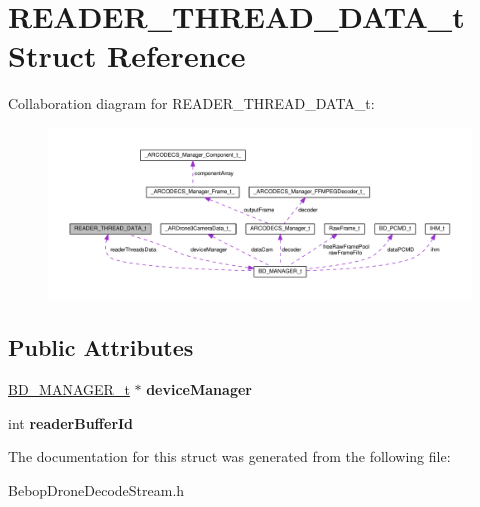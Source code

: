 \hypertarget{structREADER__THREAD__DATA__t}{}\section{R\+E\+A\+D\+E\+R\+\_\+\+T\+H\+R\+E\+A\+D\+\_\+\+D\+A\+T\+A\+\_\+t Struct Reference}
\label{structREADER__THREAD__DATA__t}


Collaboration diagram for R\+E\+A\+D\+E\+R\+\_\+\+T\+H\+R\+E\+A\+D\+\_\+\+D\+A\+T\+A\+\_\+t\+:
\nopagebreak
\begin{figure}[H]
\begin{center}
\leavevmode
\includegraphics[width=350pt]{structREADER__THREAD__DATA__t__coll__graph}
\end{center}
\end{figure}
\subsection*{Public Attributes}
\begin{DoxyCompactItemize}
\item 
\hypertarget{structREADER__THREAD__DATA__t_a5b41dd4679caf26ca0d348df673cbab1}{}\hyperlink{structBD__MANAGER__t}{B\+D\+\_\+\+M\+A\+N\+A\+G\+E\+R\+\_\+t} $\ast$ {\bfseries device\+Manager}\label{structREADER__THREAD__DATA__t_a5b41dd4679caf26ca0d348df673cbab1}

\item 
\hypertarget{structREADER__THREAD__DATA__t_a58c42dc9083eb1a735d5c14fcbe4d75c}{}int {\bfseries reader\+Buffer\+Id}\label{structREADER__THREAD__DATA__t_a58c42dc9083eb1a735d5c14fcbe4d75c}

\end{DoxyCompactItemize}


The documentation for this struct was generated from the following file\+:\begin{DoxyCompactItemize}
\item 
Bebop\+Drone\+Decode\+Stream.\+h\end{DoxyCompactItemize}
